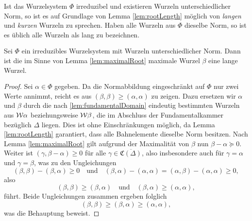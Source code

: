 \begin{bem}
  Ist das Wurzelsystem $\Phi$ irreduzibel und existieren Wurzeln unterschiedlicher Norm, so ist es auf Grundlage von Lemma \ref{lem:rootLength} möglich von \emph{langen} und \emph{kurzen} Wurzeln zu sprechen.
  Haben alle Wurzeln aus $\Phi$ dieselbe Norm, so ist es üblich alle Wurzeln als lang zu bezeichnen.
\end{bem}

\begin{lem}
  Sei $\Phi$ ein irreduzibles Wurzelsystem mit Wurzeln unterschiedlicher Norm.
  Dann ist die im Sinne von Lemma \ref{lem:maximalRoot} maximale Wurzel $\beta$ eine lange Wurzel.
\end{lem}

\begin{proof}
  Sei $\alpha \in \Phi$ gegeben.
  Da die Normabbildung eingeschränkt auf $\Phi$ nur zwei Werte annimmt, reicht es aus $(\beta, \beta) \geq (\alpha, \alpha)$ zu zeigen.
  Dazu ersetzen wir $\alpha$ und $\beta$ durch die nach \ref{lem:fundamentalDomain} eindeutig bestimmten Wurzeln aus $\mathcal{W}\alpha$ beziehungsweise $\mathcal{W}\beta$, die im Abschluss der Fundamentalkammer bezüglich $\Delta$ liegen. 
  Dies ist ohne Einschränkungen möglich, da Lemma \ref{lem:rootLength} garantiert, dass alle Bahnelemente dieselbe Norm besitzen.
  Nach Lemma \ref{lem:maximalRoot} gilt aufgrund der Maximalität von $\beta$ nun $\beta - \alpha \succeq 0$.
  Weiter ist $(\gamma, \beta - \alpha) \geq 0$ für alle $\gamma \in \overline{\mathfrak{C}(\Delta)}$, also insbesondere auch für $\gamma = \alpha$ und $\gamma = \beta$, was zu den Ungleichungen
  \begin{displaymath}
    (\beta, \beta) - (\beta, \alpha) \geq 0 \quad\text{und}\quad 
    (\beta, \alpha) - (\alpha, \alpha) 
    = (\alpha, \beta) - (\alpha, \alpha) \geq 0,
  \end{displaymath}
  also
  \begin{displaymath}
    (\beta, \beta)  \geq (\beta, \alpha) \quad\text{und}\quad 
    (\beta, \alpha) \geq (\alpha, \alpha),
  \end{displaymath}
  führt.
  Beide Ungleichungen zusammen ergeben folglich
  \begin{displaymath}
    (\beta, \beta) \geq (\beta, \alpha) \geq (\alpha, \alpha),
  \end{displaymath}
  was die Behauptung beweist.
\end{proof}
